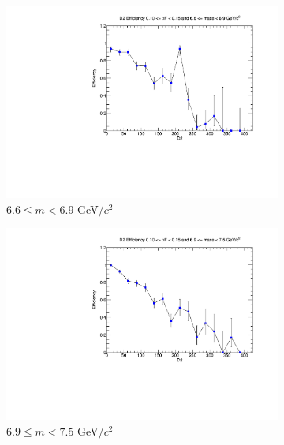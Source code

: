 \documentclass[11pt]{article}
\begin{document}
\begin{figure}[p]
\begin{subfigure}[b]{0.32\textwidth}
        \includegraphics[width=\textwidth]{./kTrackerEfficiencyPlots/D2_Efficiency_xF2_mass8.pdf}
        \caption{$6.6 \leq m < 6.9$ GeV/$c^2$}
    \end{subfigure}\vspace{0.5cm}
    \begin{subfigure}[b]{0.32\textwidth}
        \centering
        \includegraphics[width=\textwidth]{./kTrackerEfficiencyPlots/D2_Efficiency_xF2_mass9.pdf}
        \caption{$6.9 \leq m < 7.5$ GeV/$c^2$}
    \end{subfigure}\hfill
    \begin{subfigure}[b]{0.32\textwidth}
        \centering

\end{subfigure}
\end{figure}
\end{document}
